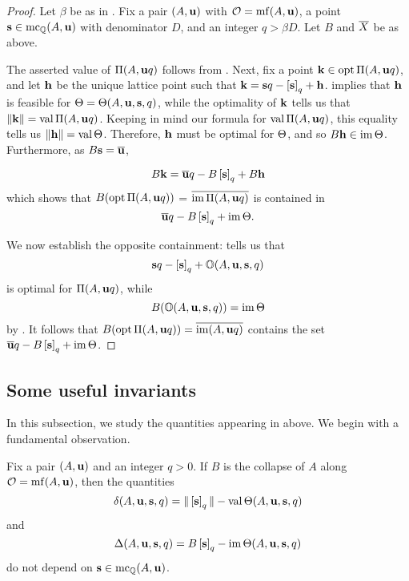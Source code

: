 \documentclass[11pt]{amsart}
\begin{document}
\begin{proof}
Let $\beta$ be as in .  Fix a pair $(A, \mathbf{u})$ with $\mathcal{O} = \operatorname{mf}(A, \mathbf{u})$, a point $\mathbf{s} \in \operatorname{mc}_{\mathbb{Q}}(A, \mathbf{u})$ with denominator $D$, and an integer $q > \beta D$.  Let $B$ and $\overline{X}$ be as above.

The asserted value of $\Pi(A, \mathbf{u}q)$ follows from .  Next, fix a point $\mathbf{k} \in \operatorname{opt} \Pi(A, \mathbf{u}q)$, and let $\mathbf{h}$ be the unique lattice point such that $\mathbf{k} = \mathbf{s}q - \left[ \mathbf{s} \right]_q + \mathbf{h}$.   implies that $\mathbf{h}$ is feasible for $\Theta = \Theta(A, \mathbf{u}, \mathbf{s}, q)$, while the optimality of $\mathbf{k}$ tells us that $\| \mathbf{k} \| = \operatorname{val} \Pi(A, \mathbf{u}q)$.  Keeping in mind our formula for $\operatorname{val} \Pi(A, \mathbf{u}q)$, this equality tells us $\| \mathbf{h} \| = \operatorname{val} \Theta$.    Therefore, $\mathbf{h}$ must be optimal for $\Theta$,  and so $B \mathbf{h} \in \operatorname{im} \Theta$.  Furthermore, as $B \mathbf{s} = \overline{\mathbf{u}}$, 

\[ B \mathbf{k} = \overline{\mathbf{u}} q - B \left[ \mathbf{s} \right]_q + B \mathbf{h}\]  
which shows that $B ( \operatorname{opt} \Pi(A, \mathbf{u}q))$ = $\overline{\operatorname{im} \Pi(A, \mathbf{u}q)}$ is contained in 
\[ \overline{\mathbf{u}} q - B \left[ \mathbf{s} \right]_q + \operatorname{im} \Theta.\]

We now establish the opposite containment:   tells us that \[  \mathbf{s}q - \left[ \mathbf{s} \right]_q + \mathbb{O}(A, \mathbf{u}, \mathbf{s}, q)\] is optimal for $\Pi(A, \mathbf{u}q)$,  while \[ B( \mathbb{O}(A, \mathbf{u}, \mathbf{s}, q)) = \operatorname{im} \Theta \] by .   It follows that $B(\operatorname{opt} \Pi(A, \mathbf{u}q)) = \overline{\operatorname{im}(A, \mathbf{u}q)}$ contains the set $\overline{\mathbf{u}} q - B \left[ \mathbf{s} \right]_q + \operatorname{im} \Theta$.
\end{proof}

\subsection{Some useful invariants}
\label{useful-invariants: ss}

In this subsection, we study the quantities appearing in  above.  We begin with a fundamental observation.


\begin{corollary}  
\label{independence: C} Fix a pair $(A, \mathbf{u})$ and an integer $q>0$.  If $B$ is the collapse of $A$ along $\mathcal{O} = \operatorname{mf}(A, \mathbf{u})$, then the quantities
\[   \delta(A, \mathbf{u}, \mathbf{s}, q)  = \| \left[ \mathbf{s} \right]_q \|  - \operatorname{val} \Theta(A, \mathbf{u}, \mathbf{s}, q)\] and 
\[ \Delta(A, \mathbf{u}, \mathbf{s}, q)  = B \left[ \mathbf{s} \right]_q - \operatorname{im}  \Theta( A, \mathbf{u}, \mathbf{s}, q)  \] 
do not depend on  $\mathbf{s} \in \operatorname{mc}_{\mathbb{Q}}(A, \mathbf{u})$.  
\end{corollary}
\end{document}
